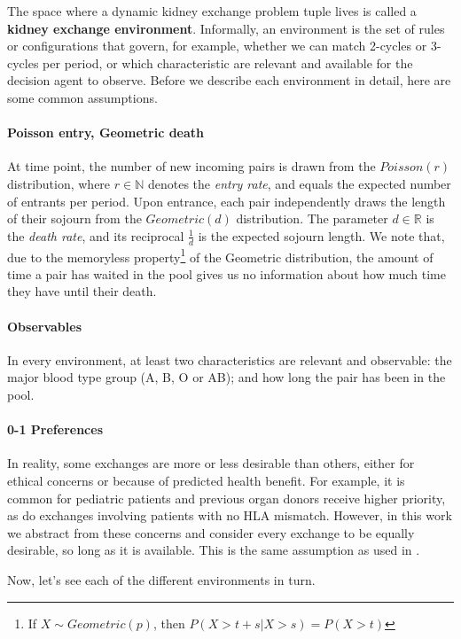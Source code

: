 \documentclass[12pt]{article}
\begin{document}
The space where a dynamic kidney exchange problem tuple lives is called a \textbf{kidney exchange environment}. Informally, an environment is the set of rules or configurations that govern, for example, whether we can match 2-cycles or 3-cycles per period, or which characteristic are relevant and available for the decision agent to observe. Before we describe each environment in detail, here are some common assumptions.

\paragraph{Poisson entry, Geometric death} At time point, the number of new incoming pairs is drawn from the $Poisson(r)$ distribution, where $r \in \mathbb{N}$ denotes the \emph{entry rate}, and equals the expected number of entrants per period. Upon entrance, each pair independently draws the length of their sojourn from the $Geometric(d)$ distribution. The parameter $d \in \mathbb{R}$ is the \emph{death rate}, and its reciprocal $\frac{1}{d}$ is the expected sojourn length. We note that, due to the memoryless property\footnote{If $X \sim Geometric(p)$, then $P(X > t+s | X > s) = P(X > t)$} of the Geometric distribution, the amount of time a pair has waited in the pool gives us no information about how much time they have until their death.

\paragraph{Observables} In every environment, at least two characteristics are relevant and observable: the major blood type group (A, B, O or AB); and how long the pair has been in the pool.

\paragraph{0-1 Preferences} In reality, some exchanges are more or less desirable than others, either for ethical concerns or because of predicted health benefit. For example, it is common for pediatric patients and previous organ donors receive higher priority, as do exchanges involving patients with no HLA mismatch. However, in this work we abstract from these concerns and consider every exchange to be equally desirable, so long as it is available. This is the same assumption as used in \cite{roth2005pairwise}.


\noindent Now, let's see each of the different environments in turn.  
\end{document}
